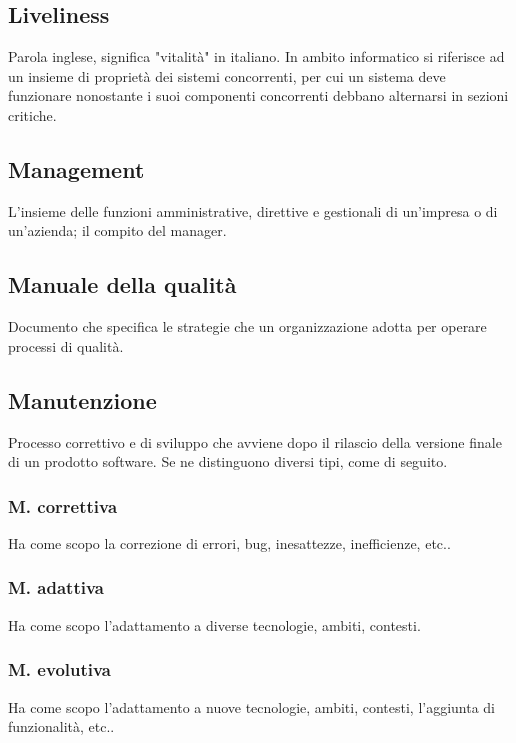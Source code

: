 	
	\subsection{Liveliness}
	\label{sec:liveliness}
	Parola inglese, significa "vitalità" in italiano. In ambito informatico si riferisce ad un insieme di proprietà dei sistemi concorrenti, per cui un sistema deve funzionare nonostante i suoi componenti concorrenti debbano alternarsi in sezioni critiche.


	\newpage

	
	\subsection{Management}
	\label{sec:management}
	L'insieme delle funzioni amministrative, direttive e gestionali di un'impresa o di un'azienda; il compito del manager.

	
	\subsection{Manuale della qualità}
	\label{sec:manualequalita}
	Documento che specifica le strategie che un organizzazione adotta per operare processi di qualità.


	\subsection{Manutenzione}
	\label{sec:manutenzione}
	Processo correttivo e di sviluppo che avviene dopo il rilascio della versione finale di un prodotto software. Se ne distinguono diversi tipi, come di seguito.

		
		\subsubsection{M. correttiva}
		Ha come scopo la correzione di errori, bug, inesattezze, inefficienze, etc..

		
		\subsubsection{M. adattiva}
		Ha come scopo l'adattamento a diverse tecnologie, ambiti, contesti.

		
		\subsubsection{M. evolutiva}
		Ha come scopo l'adattamento a nuove tecnologie, ambiti, contesti, l'aggiunta di funzionalità, etc..


